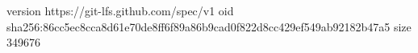 version https://git-lfs.github.com/spec/v1
oid sha256:86cc5ec8cca8d61e70de8ff6f89a86b9cad0f822d8cc429ef549ab92182b47a5
size 349676
